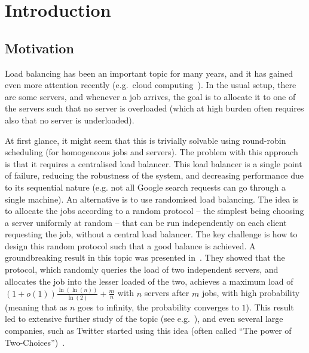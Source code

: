 \chapter{Introduction}\label{introduction}

\ifpdf
    \graphicspath{{Chapter1/Figs/Raster/}{Chapter1/Figs/PDF/}{Chapter1/Figs/}}
\else
    \graphicspath{{Chapter1/Figs/Vector/}{Chapter1/Figs/}}
\fi


\section{Motivation}

Load balancing has been an important topic for many years, and it has gained even more attention recently (e.g.\ cloud computing~\cite{mishra2020cloud}). In the usual setup, there are some servers, and whenever a job arrives, the goal is to allocate it to one of the servers such that no server is overloaded (which at high burden often requires also that no server is underloaded).


At first glance, it might seem that this is trivially solvable using round-robin scheduling (for homogeneous jobs and servers). The problem with this approach is that it requires a centralised load balancer. This load balancer is a single point of failure, reducing the robustness of the system, and decreasing performance due to its sequential nature (e.g. not all Google search requests can go through a single machine). An alternative is to use randomised load balancing. The idea is to allocate the jobs according to a random protocol -- the simplest being choosing a server uniformly at random -- that can be run independently on each client requesting the job, without a central load balancer. The key challenge is how to design this random protocol such that a good balance is achieved. A groundbreaking result in this topic was presented in~\cite{azar1999twochoice}. They showed that the \TwoChoice protocol, which randomly queries the load of two independent servers, and allocates the job into the lesser loaded of the two, achieves a maximum load of $(1+o(1))\frac{\ln(\ln(n))}{\ln(2)} + \frac{m}{n}$ with $n$ servers after $m$ jobs, with high probability (meaning that as $n$ goes to infinity, the probability converges to $1$). This result led to extensive further study of the topic (see e.g.~\cite{richa2001surveytwochoice}), and even several large companies, such as Twitter started using this idea (often called ``The power of Two-Choices'')~\cite{anderson2019twitter}.


